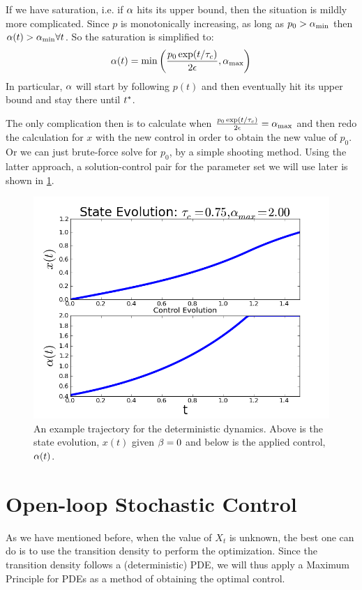 \documentclass{article}
\begin{document}
If we have saturation, i.e. if ${\alpha}$ hits its upper bound, then the situation is
mildly more complicated. Since $p$ is monotonically increasing, as long as $p_0
> { {\alpha}_{\textrm{min}} }$ then ${\alpha}(t) > { {\alpha}_{\textrm{min}} } \forall t$. So the saturation is simplified to:
\begin{equation}
{\alpha}(t) = \min \left(\frac{p_0 \exp(t / { \tau_{c} })}{2{\epsilon}} , { {\alpha}_{\textrm{max}} } \right)
\label{eq:deterministic_control_bounds}
\end{equation}
In particular, ${\alpha}$ will start by following $p(t)$ and then eventually hit its
upper bound and stay there until ${ t^* }$. 

The only complication then is to calculate when $\frac{p_0 \exp(t / { \tau_{c} })}{2{\epsilon}} =
{ {\alpha}_{\textrm{max}} }$ and then redo the calculation for $x$ with the new control in order to
obtain the new value of $p_0$. Or we can just brute-force solve for $p_0$, by a
simple shooting method. Using the latter approach, a solution-control pair for
the parameter set we will use later is shown in \cref{fig:deterministic_soln_controls}. 
\begin{figure}[htp]
\begin{center}
  \includegraphics[width=.7\textwidth]{Figs/ControlSimulator/deterministic_example.png}
  \caption[]{An example trajectory for the deterministic dynamics. Above is the
  state evolution, $x(t)$ given ${\beta}=0$ and below is the applied control,
  ${\alpha}(t)$. }
  \label{fig:deterministic_soln_controls}
\end{center}
\end{figure}

\section{Open-loop Stochastic Control}
As we have mentioned before, when the value of $X_t$ is unknown, the best one
can do is to use the transition density to perform the optimization. Since the
transition density follows a (deterministic) PDE, we will thus apply a Maximum
Principle for PDEs as a method of obtaining the optimal control. 
\end{document}
